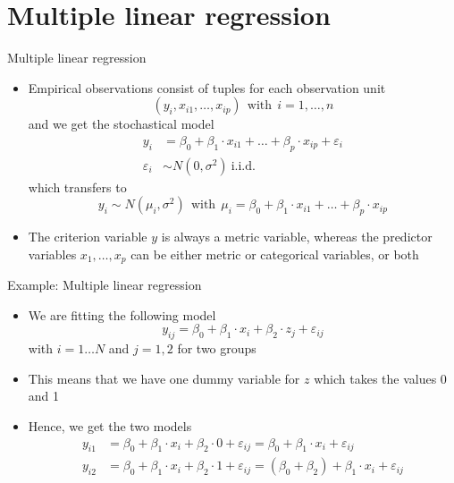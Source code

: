 \documentclass[aspectratio=169]{beamer}
\begin{document}
\section{Multiple linear regression}

\begin{frame}{Multiple linear regression}
  \begin{itemize}
    \item Empirical observations consist of tuples for each observation
      unit
\[
  (y_i, x_{i1}, \ldots, x_{ip}) ~~\text{with}~~ i = 1, \ldots, n
\]
and we get the stochastical model
\begin{align*}
  y_i & = \beta_0 + \beta_1 \cdot x_{i1} + \ldots + \beta_p \cdot x_{ip} +
        \varepsilon_i \\
  \varepsilon_i & \sim N (0, \sigma^2)~\text{i.i.d.}
\end{align*}
which transfers to
\[
  y_i \sim N (\mu_i, \sigma^2) ~~\text{with}~~
  \mu_i = \beta_0 + \beta_1 \cdot x_{i1} + \ldots + \beta_p \cdot x_{ip}
\]\vspace{-.7cm}
\item The criterion variable $y$ is always a metric variable, whereas the
  predictor variables $x_1, \ldots, x_p$ can be either metric or
      categorical variables, or both
  \end{itemize}
\end{frame}

\begin{frame}[fragile]{Example: Multiple linear regression}
  \begin{itemize}
    \item We are fitting the following model
\[
y_{ij} = \beta_0 + \beta_1 \cdot x_i + \beta_2 \cdot z_j + \varepsilon_{ij}
\]
with $i = 1 \ldots N$ and $j = 1,2$ for two groups
\item This means that we have one dummy variable for $z$ which takes the
  values 0 and 1
\item Hence, we get the two models
\begin{align*}
y_{i1} & = \beta_0 + \beta_1 \cdot x_i + \beta_2\cdot 0 + \varepsilon_{ij}
= \beta_0 + \beta_1 \cdot x_i + \varepsilon_{ij}\\
y_{i2} & = \beta_0 + \beta_1 \cdot x_i + \beta_2\cdot 1 + \varepsilon_{ij}
= (\beta_0 + \beta_2) + \beta_1 \cdot x_i + \varepsilon_{ij}
\end{align*}
  \end{itemize}
\end{frame}
\end{document}
